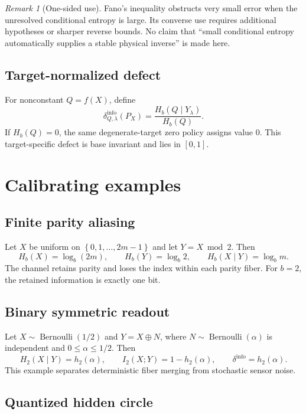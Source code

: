 \documentclass[11pt,a4paper]{article}
\theoremstyle{definition}
\theoremstyle{plain}
\theoremstyle{remark}
\newtheorem{remark}[definition]{Remark}
\newcommand{\1}{\mathbf{1}}
\newcommand{\Hb}{H_b}
\newcommand{\dinfo}{\delta^{\mathrm{info}}}
\newcommand{\set}[1]{\left\{#1\right\}}
\begin{document}
\begin{remark}[One-sided use]
Fano's inequality obstructs very small error when the unresolved
conditional entropy is large. Its converse use requires additional
hypotheses or sharper reverse bounds. No claim that ``small conditional
entropy automatically supplies a stable physical inverse'' is made here.
\end{remark}

\subsection{Target-normalized defect}

For nonconstant $Q=f(X)$, define
\[
\delta^{\mathrm{info}}_{Q,\lambda}(P_X)
=
\frac{\Hb(Q\mid Y_\lambda)}{\Hb(Q)}.
\]
If $\Hb(Q)=0$, the same degenerate-target zero policy assigns value $0$.
This target-specific defect is base invariant and lies in $[0,1]$.

\section{Calibrating examples}

\subsection{Finite parity aliasing}

Let $X$ be uniform on $\set{0,1,\ldots,2m-1}$ and let
$Y=X\bmod2$. Then
\[
\Hb(X)=\log_b(2m),\qquad
\Hb(Y)=\log_b2,\qquad
\Hb(X\mid Y)=\log_bm.
\]
The channel retains parity and loses the index within each parity fiber.
For $b=2$, the retained information is exactly one bit.

\subsection{Binary symmetric readout}

Let $X\sim\operatorname{Bernoulli}(1/2)$ and
$Y=X\oplus N$, where $N\sim\operatorname{Bernoulli}(\alpha)$ is independent
and $0\leq\alpha\leq1/2$. Then
\[
H_2(X\mid Y)=h_2(\alpha),
\qquad
I_2(X;Y)=1-h_2(\alpha),
\qquad
\dinfo=h_2(\alpha).
\]
This example separates deterministic fiber merging from stochastic sensor
noise.

\subsection{Quantized hidden circle}
\end{document}
